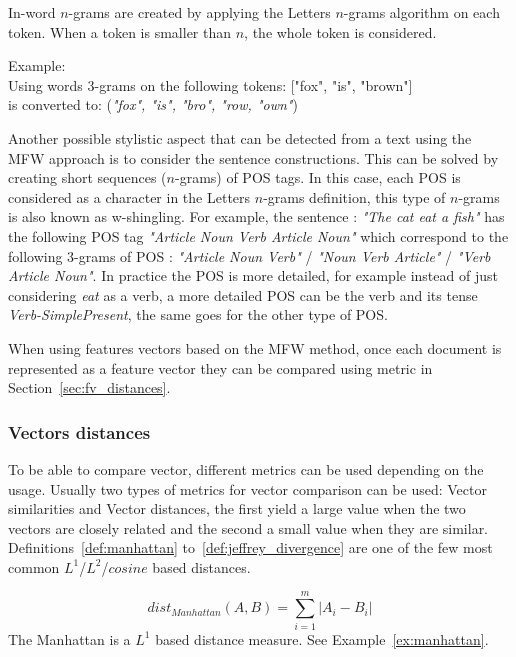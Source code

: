 \begin{definition}
  \label{def:words_n_grams}
  In-word $n$-grams are created by applying the Letters $n$-grams algorithm on each token.
  When a token is smaller than $n$, the whole token is considered.

  Example: \\
  Using words 3-grams on the following tokens: ["fox", "is", "brown"] \\
  is converted to: (\textit{"fox", "is", "bro", "row, "own"})
\end{definition}

Another possible stylistic aspect that can be detected from a text using the MFW approach is to consider the sentence constructions.
This can be solved by creating short sequences ($n$-grams) of POS tags.
In this case, each POS is considered as a character in the Letters $n$-grams definition, this type of $n$-grams is also known as w-shingling.
For example, the sentence : \textit{"The cat eat a fish"} has the following POS tag \textit{"Article Noun Verb Article Noun"} which correspond to the following 3-grams of POS : \textit{"Article Noun Verb"} / \textit{"Noun Verb Article"} / \textit{"Verb Article Noun"}.
In practice the POS is more detailed, for example instead of just considering \textit{eat} as a verb, a more detailed POS can be the verb and its tense \textit{Verb-SimplePresent}, the same goes for the other type of POS.

When using features vectors based on the MFW method, once each document is represented as a feature vector they can be compared using metric in Section~\ref{sec:fv_distances}.

\subsubsection{Vectors distances \label{sec:fv_distances}}

To be able to compare vector, different metrics can be used depending on the usage.
Usually two types of metrics for vector comparison can be used: Vector similarities and Vector distances, the first yield a large value when the two vectors are closely related and the second a small value when they are similar.
Definitions~\ref{def:manhattan} to~\ref{def:jeffrey_divergence} are one of the few most common $L^1$/$L^2$/$cosine$ based distances.

\begin{definition}
  \begin{equation}
    dist_{Manhattan}(A, B) = \sum_{i=1}^{m} |A_i - B_i|
  \end{equation}
  The Manhattan is a $L^1$ based distance measure. See Example~\ref{ex:manhattan}.
\end{definition}

